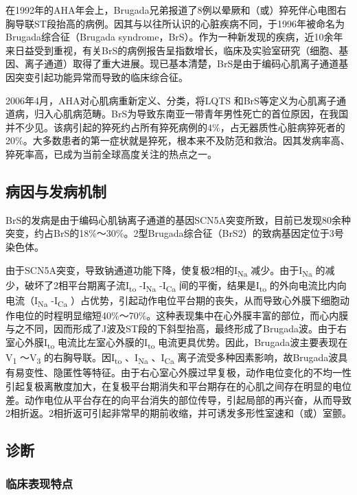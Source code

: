 在1992年的AHA年会上，Brugada兄弟报道了8例以晕厥和（或）猝死伴心电图右胸导联ST段抬高的病例。因其与以往所认识的心脏疾病不同，于1996年被命名为Brugada综合征（Brugada
syndrome，BrS）。作为一种新发现的疾病，近10余年来日益受到重视，有关BrS的病例报告呈指数增长，临床及实验室研究（细胞、基因、离子通道）取得了重大进展。现已基本清楚，BrS是由于编码心肌离子通道基因突变引起功能异常而导致的临床综合征。

2006年4月，AHA对心肌病重新定义、分类，将LQTS
和BrS等定义为心肌离子通道病，归入心肌病范畴。BrS为导致东南亚一带青年男性死亡的首位原因，在我国并不少见。该病引起的猝死约占所有猝死病例的4\%，占无器质性心脏病猝死者的20\%。大多数患者的第一症状就是猝死，根本来不及防范和救治。因其发病率高、猝死率高，已成为当前全球高度关注的热点之一。

\subsection{病因与发病机制}

BrS的发病是由于编码心肌钠离子通道的基因SCN5A突变所致，目前已发现80余种突变，约占BrS的18\%～30\%。2型Brugada综合征（BrS2）的致病基因定位于3号染色体。

由于SCN5A突变，导致钠通道功能下降，使复极2相的I\textsubscript{Na}
减少。由于I\textsubscript{Na}
的减少，破坏了2相平台期离子流I\textsubscript{to} -I\textsubscript{Na}
-I\textsubscript{Ca} 间的平衡，结果是I\textsubscript{to}
的外向电流比内向电流（I\textsubscript{Na} -I\textsubscript{Ca}
）占优势，引起动作电位平台期的丧失，从而导致心外膜下细胞动作电位的时程明显缩短40\%～70\%。这种表现集中在心外膜丰富的部位，而心内膜与之不同，因而形成了J波及ST段的下斜型抬高，最终形成了Brugada波。由于右室心外膜I\textsubscript{to}
电流比左室心外膜的I\textsubscript{to}
电流更具优势。因此，Brugada波主要表现在V\textsubscript{1}
～V\textsubscript{3} 的右胸导联。因I\textsubscript{to}
、I\textsubscript{Na} 、I\textsubscript{Ca}
离子流受多种因素影响，故Brugada波具有易变性、隐匿性等特征。由于右心室心外膜过早复极，动作电位变化的不均一性引起复极离散度加大，在复极平台期消失和平台期存在的心肌之间存在明显的电位差。动作电位从平台存在的向平台消失的部位传导，引起局部的再兴奋，从而导致2相折返。2相折返可引起非常早的期前收缩，并可诱发多形性室速和（或）室颤。

\subsection{诊断}

\subsubsection{临床表现特点}

